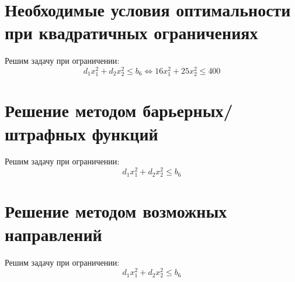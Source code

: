 \section{Необходимые условия оптимальности при квадратичных ограничениях}

Решим задачу при ограничении:
\begin{equation*}
d_1 x_1^2 + d_2 x_2^2 \leq b_6
\Longleftrightarrow
16 x_1^2 + 25 x_2^2 \leq 400
\end{equation*}

\section{Решение методом барьерных/штрафных функций}

Решим задачу при ограничении:
\begin{equation*}
d_1 x_1^2 + d_2 x_2^2 \leq b_6
\end{equation*}

\section{Решение методом возможных направлений}

Решим задачу при ограничении:
\begin{equation*}
d_1 x_1^2 + d_2 x_2^2 \leq b_6
\end{equation*}

